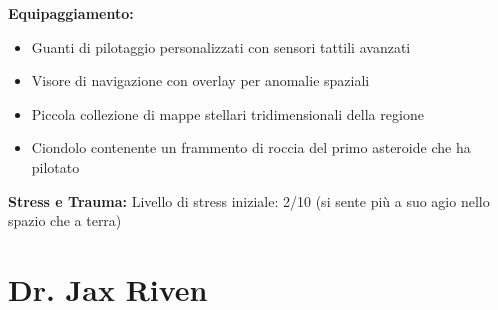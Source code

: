 \documentclass[11pt,a4paper]{article}
\begin{document}
\begin{tcolorbox}[colback=mininglightorange!20, colframe=miningorange]
\textbf{Equipaggiamento:}
\begin{itemize}[leftmargin=*]
\item Guanti di pilotaggio personalizzati con sensori tattili avanzati
\item Visore di navigazione con overlay per anomalie spaziali
\item Piccola collezione di mappe stellari tridimensionali della regione
\item Ciondolo contenente un frammento di roccia del primo asteroide che ha pilotato
\end{itemize}

\textbf{Stress e Trauma:} Livello di stress iniziale: 2/10 (si sente più a suo agio nello spazio che a terra)
\end{tcolorbox}

\section{Dr. Jax Riven}
\end{document}
